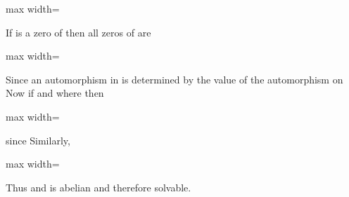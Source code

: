 \documentclass[11pt,oneside]{article}
\begin{document}
\begin{BookBody}
\begin{center}\begin{adjustbox}{max width=\linewidth}\end{adjustbox}\end{center}

\noindent If  is a zero of  then all zeros of  are

\begin{center}\begin{adjustbox}{max width=\linewidth}\end{adjustbox}\end{center}

\noindent Since  an automorphism \BookInline{\sigma } in  is determined by the value \BookInline{\sigma (\beta )} of the automorphism \BookInline{\sigma } on  Now if  and  where  then

\begin{center}\begin{adjustbox}{max width=\linewidth}\end{adjustbox}\end{center}

\noindent since  Similarly,

\begin{center}\begin{adjustbox}{max width=\linewidth}\end{adjustbox}\end{center}

\noindent Thus \BookInline{\sigma \tau = \tau \sigma,\allowbreak } and  is abelian and therefore solvable.


\end{BookBody}
\end{document}
